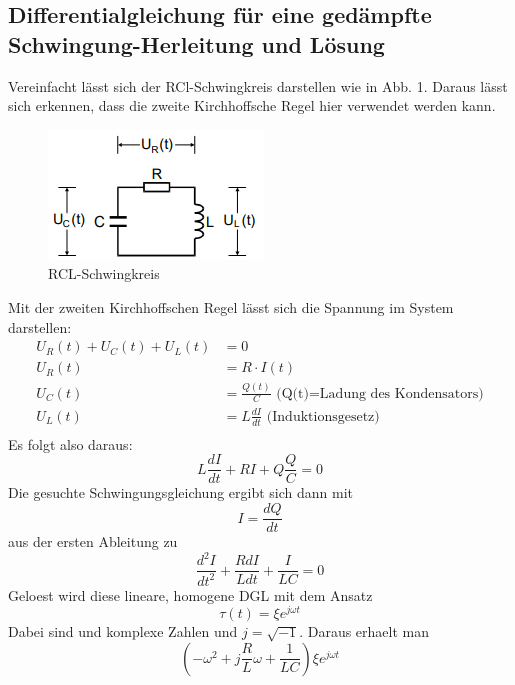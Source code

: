 \documentclass[titlepage=firstcover, captions=tableheading]{scrartcl}
\begin{document}
\subsection{Differentialgleichung für eine gedämpfte Schwingung-Herleitung und Lösung}
Vereinfacht lässt sich der RCl-Schwingkreis darstellen wie in Abb. 1. Daraus lässt sich erkennen, dass die zweite Kirchhoffsche Regel hier verwendet werden kann.
\begin{figure}[H]
    \centering
    \includegraphics{"Schaltkreis_RCL.png"}
    \caption{RCL-Schwingkreis}
\end{figure}
Mit der zweiten Kirchhoffschen Regel lässt sich die Spannung im System darstellen:
\begin{align}
    U_R(t)+U_C(t)+U_L(t)&=0\nonumber\\
    U_R(t)&=R\cdot I(t)\nonumber\\
    U_C(t)&=\frac{Q(t)}{C} \text{ (Q(t)=Ladung des Kondensators)}\nonumber\\
    U_L(t)&=L\frac{dI}{dt} \text{ (Induktionsgesetz)}\nonumber\\\nonumber
\end{align}
Es folgt also daraus:
\begin{equation}
  L\frac{dI}{dt}+RI+Q\frac{Q}{C}=0  \nonumber
\end{equation}
Die gesuchte Schwingungsgleichung ergibt sich dann mit 
\begin{equation}
    I=\frac{dQ}{dt}\nonumber
\end{equation}
aus der ersten Ableitung zu 
\begin{equation} \label{DGL}
    \frac{d^2I}{dt^2}+\frac{RdI}{Ldt}+\frac{I}{LC}=0
\end{equation}
Geloest wird diese lineare, homogene DGL mit dem Ansatz 
\begin{equation}
    \tau(t)=\xi e^{j\omega t}\nonumber
\end{equation}
Dabei sind \xi und \omega komplexe Zahlen und $j=\sqrt{-1}$.
Daraus erhaelt man 
\begin{equation}
    (-\omega^2+j\frac{R}{L}\omega+\frac{1}{LC})\xi e^{j\omega t} \nonumber
\end{equation}
\end{document}
